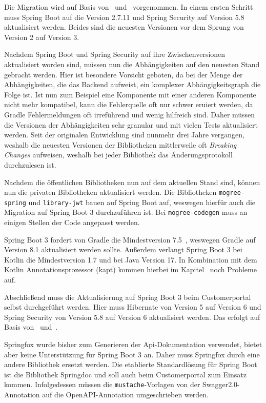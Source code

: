 Die Migration wird auf Basis von~\parencite{baeldungspring3migration} und~\parencite{githubspringmigration} vorgenommen. In einem ersten Schritt muss Spring Boot auf die Version 2.7.11 und Spring Security auf Version 5.8 aktualisiert werden. Beides sind die neuesten Versionen vor dem Sprung von Version 2 auf Version 3.

Nachdem Spring Boot und Spring Security auf ihre Zwischenversionen aktualisiert worden sind, müssen nun die Abhängigkeiten auf den neuesten Stand gebracht werden. Hier ist besondere Vorsicht geboten, da bei der Menge der Abhängigkeiten, die das Backend aufweist, ein komplexer Abhängigkeitsgraph die Folge ist. Ist nun zum Beispiel eine Komponente mit einer anderen Komponente nicht mehr kompatibel, kann die Fehlerquelle oft nur schwer eruiert werden, da Gradle Fehlermeldungen oft irreführend und wenig hilfreich sind. Daher müssen die Versionen der Abhängigkeiten sehr granular und mit vielen Tests aktualisiert werden. Seit der originalen Entwicklung sind nunmehr drei Jahre vergangen, weshalb die neuesten Versionen der Bibliotheken mittlerweile oft \textit{Breaking Changes} aufweisen, weshalb bei jeder Bibliothek das Änderungsprotokoll durchzulesen ist.

Nachdem die öffentlichen Bibliotheken nun auf dem aktuellen Stand sind, können nun die privaten Bibliotheken aktualisiert werden. Die Bibliotheken \texttt{mogree-spring} und \texttt{library-jwt} bauen auf Spring Boot auf, weswegen hierfür auch die Migration auf Spring Boot 3 durchzuführen ist. Bei \texttt{mogree-codegen} muss an einigen Stellen der Code angepasst werden.

Spring Boot 3 fordert von Gradle die Mindestversion 7.5~\parencite{springbootgradleminversion}, weswegen Gradle auf Version 8.1 aktualisiert werden sollte. Außerdem verlangt Spring Boot 3 bei Kotlin die Mindestversion 1.7 und bei Java Version 17. In Kombination mit dem Kotlin Annotationsprozessor (kapt) kommen hierbei im Kapitel~ noch Probleme auf.

Abschließend muss die Aktualisierung auf Spring Boot 3 beim Customerportal selbst durchgeführt werden. Hier muss Hibernate von Version 5 auf Version 6 und Spring Security von Version 5.8 auf Version 6 aktualisiert werden. Das erfolgt auf Basis von~\parencite{hibernate6migration} und~\parencite{springsecurity6migration}.

Springfox wurde bisher zum Generieren der Api-Dokumentation verwendet, bietet aber keine Unterstützung für Spring Boot 3 an. Daher muss Springfox durch eine andere Bibliothek ersetzt werden. Die etablierte Standardlösung für Spring Boot ist die Bibliothek Springdoc und soll auch beim Customerportal zum Einsatz kommen. Infolgedessen müssen die \texttt{mustache}-Vorlagen von der Swagger2.0-Annotation auf die OpenAPI-Annotation umgeschrieben werden.

